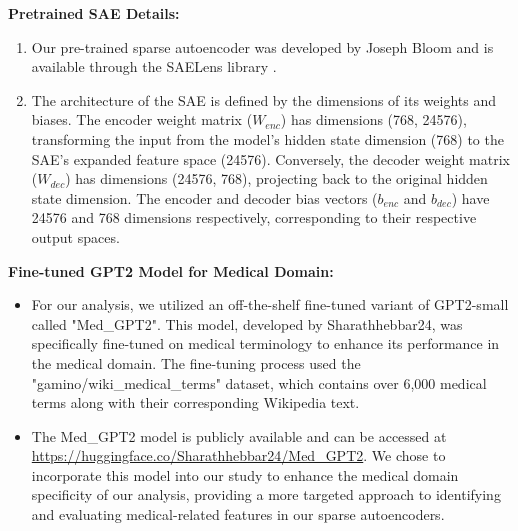 \hypertarget{baseline-details}{%
\textbf{Pretrained SAE Details:} 
\begin{enumerate}
    \item Our pre-trained sparse autoencoder was developed by Joseph Bloom and is available through the SAELens library \cite{bloom2024saetrainingcodebase}.
    \item The architecture of the SAE is defined by the dimensions of its weights and biases. The encoder weight matrix ($W_{enc}$) has dimensions (768, 24576), transforming the input from the model's hidden state dimension (768) to the SAE's expanded feature space (24576). Conversely, the decoder weight matrix ($W_{dec}$) has dimensions (24576, 768), projecting back to the original hidden state dimension. The encoder and decoder bias vectors ($b_{enc}$ and $b_{dec}$) have 24576 and 768 dimensions respectively, corresponding to their respective output spaces.
\end{enumerate}
}

\hypertarget{med-gpt2}{%
\textbf{Fine-tuned GPT2 Model for Medical Domain:}
\begin{itemize}
    \item For our analysis, we utilized an off-the-shelf fine-tuned variant of GPT2-small called "Med\_GPT2". This model, developed by Sharathhebbar24, was specifically fine-tuned on medical terminology to enhance its performance in the medical domain. The fine-tuning process used the "gamino/wiki\_medical\_terms" dataset, which contains over 6,000 medical terms along with their corresponding Wikipedia text.
    \item The Med\_GPT2 model is publicly available and can be accessed at \url{https://huggingface.co/Sharathhebbar24/Med_GPT2}. We chose to incorporate this model into our study to enhance the medical domain specificity of our analysis, providing a more targeted approach to identifying and evaluating medical-related features in our sparse autoencoders.
\end{itemize}
}

